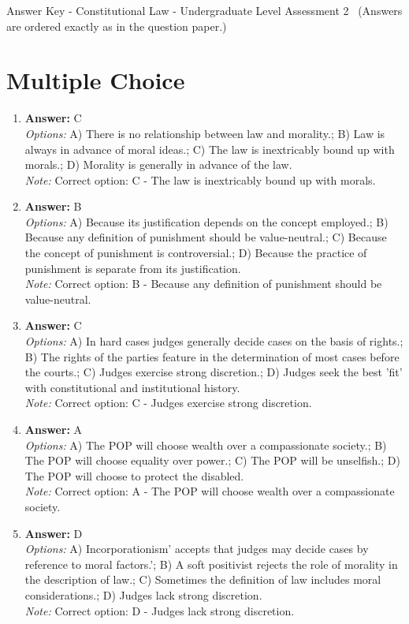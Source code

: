 \documentclass[12pt]{article}
\begin{document}
\begin{center}
Answer Key - Constitutional Law - Undergraduate Level Assessment 2 \
\small (Answers are ordered exactly as in the question paper.)
\end{center}

\section*{Multiple Choice}
\begin{enumerate}[label=\arabic*.]
\item \textbf{Answer:} C
\\ \textit{Options:} A) There is no relationship between law and morality.; B) Law is always in advance of moral ideas.; C) The law is inextricably bound up with morals.; D) Morality is generally in advance of the law.
\\ \textit{Note:} Correct option: C - The law is inextricably bound up with morals.
\item \textbf{Answer:} B
\\ \textit{Options:} A) Because its justification depends on the concept employed.; B) Because any definition of punishment should be value-neutral.; C) Because the concept of punishment is controversial.; D) Because the practice of punishment is separate from its justification.
\\ \textit{Note:} Correct option: B - Because any definition of punishment should be value-neutral.
\item \textbf{Answer:} C
\\ \textit{Options:} A) In hard cases judges generally decide cases on the basis of rights.; B) The rights of the parties feature in the determination of most cases before the courts.; C) Judges exercise strong discretion.; D) Judges seek the best 'fit' with constitutional and institutional history.
\\ \textit{Note:} Correct option: C - Judges exercise strong discretion.
\item \textbf{Answer:} A
\\ \textit{Options:} A) The POP will choose wealth over a compassionate society.; B) The POP will choose equality over power.; C) The POP will be unselfish.; D) The POP will choose to protect the disabled.
\\ \textit{Note:} Correct option: A - The POP will choose wealth over a compassionate society.
\item \textbf{Answer:} D
\\ \textit{Options:} A) Incorporationism' accepts that judges may decide cases by reference to moral factors.'; B) A soft positivist rejects the role of morality in the description of law.; C) Sometimes the definition of law includes moral considerations.; D) Judges lack strong discretion.
\\ \textit{Note:} Correct option: D - Judges lack strong discretion.
\end{enumerate}
\end{document}
